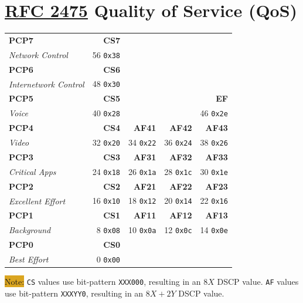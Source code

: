 \documentclass[12pt]{article}
\newcommand{\note}[1]{\colorbox{#1}{Note:}}
\newcommand{\RFC}[1]{\href{https://datatracker.ietf.org/doc/html/rfc#1}{RFC #1}}
\begin{document}
\section[RFC 2475 QoS]{\RFC{2475} Quality of Service (QoS) \label{sec:QOS}}
	\begin{table}[H]
	\centering
	\begin{tabular}{ l r r r r }
	\textbf{PCP7}			& \textbf{CS7}	&			&			&\\
	\textit{Network Control}	& 56 \texttt{0x38}	&			&			&\\
	\textbf{PCP6}			& \textbf{CS6}	&			&			&\\
	\textit{Internetwork Control}	& 48 \texttt{0x30}	&			&			&\\
	\textbf{PCP5}			& \textbf{CS5}	&			&			& \textbf{EF}\\
	\textit{Voice}			& 40 \texttt{0x28}	&			&			& 46 \texttt{0x2e}\\
	\textbf{PCP4}			& \textbf{CS4}	& \textbf{AF41}	& \textbf{AF42}	& \textbf{AF43}\\
	\textit{Video}			& 32 \texttt{0x20} & 34 \texttt{0x22} & 36 \texttt{0x24} & 38 \texttt{0x26}\\
	\textbf{PCP3}			& \textbf{CS3}	& \textbf{AF31}	& \textbf{AF32}	& \textbf{AF33}\\
	\textit{Critical Apps}		& 24 \texttt{0x18} & 26 \texttt{0x1a} & 28 \texttt{0x1c} & 30 \texttt{0x1e}\\
	\textbf{PCP2}			& \textbf{CS2}	& \textbf{AF21}	& \textbf{AF22}	& \textbf{AF23}\\
	\textit{Excellent Effort}		& 16 \texttt{0x10} & 18 \texttt{0x12} & 20 \texttt{0x14} & 22 \texttt{0x16}\\
	\textbf{PCP1}			& \textbf{CS1}	& \textbf{AF11}	& \textbf{AF12}	& \textbf{AF13}\\
	\textit{Background}		& 8 \texttt{0x08} & 10 \texttt{0x0a} & 12 \texttt{0x0c} & 14 \texttt{0x0e}\\
	\textbf{PCP0}			& \textbf{CS0}	&			&			&\\
	\textit{Best Effort}			& 0 \texttt{0x00} &			&			&\\
	\end{tabular}
	\end{table}
	\note{Goldenrod} \texttt{CS} values use bit-pattern \texttt{XXX000}, resulting in an $8X$ DSCP value. \texttt{AF} values use bit-pattern \texttt{XXXYY0}, resulting in an $8X+2Y$ DSCP value.
\end{document}
